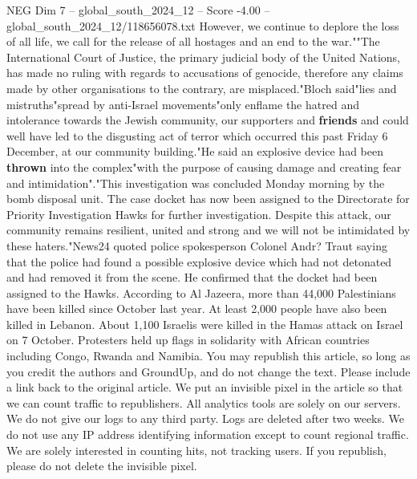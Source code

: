 \begin{textsample}{NEG Dim 7 – global\_south\_2024\_12 – Score -4.00 – global\_south\_2024\_12/118656078.txt}
However, we continue to deplore the loss of all life, we call for the release of all hostages and an end to the war.""The International Court of Justice, the primary judicial body of the United Nations, has made no ruling with regards to accusations of genocide, therefore any claims made by other organisations to the contrary, are misplaced."Bloch said"lies and mistruths"spread by anti-Israel movements"only enflame the hatred and intolerance towards the Jewish community, our supporters and \textbf{friends} and could well have led to the disgusting act of terror which occurred this past Friday 6 December, at our community building."He said an explosive device had been \textbf{thrown} into the complex"with the purpose of causing damage and creating fear and intimidation"."This investigation was concluded Monday morning by the bomb disposal unit.
The case docket has now been assigned to the Directorate for Priority Investigation Hawks for further investigation.
Despite this attack, our community remains resilient, united and strong and we will not be intimidated by these haters."News24 quoted police spokesperson Colonel Andr?
Traut saying that the police had found a possible explosive device which had not detonated and had removed it from the scene.
He confirmed that the docket had been assigned to the Hawks.
According to Al Jazeera, more than 44,000 Palestinians have been killed since October last year.
At least 2,000 people have also been killed in Lebanon.
About 1,100 Israelis were killed in the Hamas attack on Israel on 7 October.
Protesters held up flags in solidarity with African countries including Congo, Rwanda and Namibia.
You may republish this article, so long as you credit the authors and GroundUp, and do not change the text.
Please include a link back to the original article.
We put an invisible pixel in the article so that we can count traffic to republishers.
All analytics tools are solely on our servers.
We do not give our logs to any third party.
Logs are deleted after two weeks.
We do not use any IP address identifying information except to count regional traffic.
We are solely interested in counting hits, not tracking users.
If you republish, please do not delete the invisible pixel.

\end{textsample}

